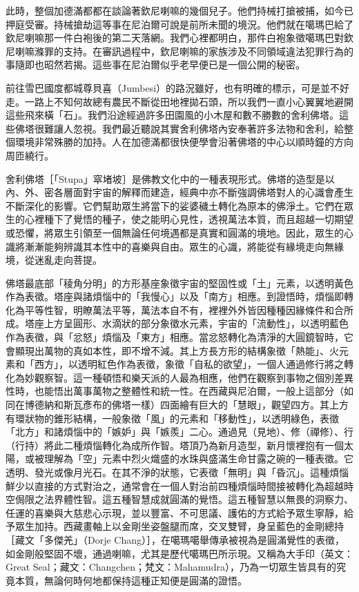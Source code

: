 此時，整個加德滿都都在談論著欽尼喇嘛的幾個兒子。他們持械打搶被捕，如今已押庭受審。持械搶劫這等事在尼泊爾可說是前所未聞的境況。他們就在噶瑪巴給了欽尼喇嘛那一件白袍後的第二天落網。我們心裡都明白，那件白袍象徵噶瑪巴對欽尼喇嘛滌罪的支持。在審訊過程中，欽尼喇嘛的家族涉及不同領域違法犯罪行為的事隨即也昭然若揭。這些事在尼泊爾似乎老早便已是一個公開的秘密。

前往雪巴國度都城尊貝喜（Jumbesi）的路況雖好，也有明確的標示，可是並不好走。一路上不知何故總有農民不斷從田地裡拋石頭，所以我們一直小心翼翼地避開這些飛來橫「石」。我們沿途經過許多田園風的小木屋和數不勝數的舍利佛塔。這些佛塔很難讓人忽視。我們最近聽說其實舍利佛塔內安奉著許多法物和舍利，給整個環境非常殊勝的加持。人在加德滿都很快便學會沿著佛塔的中心以順時鐘的方向周匝繞行。

舍利佛塔［「Stupa」窣堵坡］是佛教文化中的一種表現形式。佛塔的造型是以內、外、密各層面對宇宙的解釋而建造，經典中亦不斷強調佛塔對人的心識會產生不斷深化的影響。它們幫助眾生將當下的娑婆穢土轉化為原本的佛淨土。它們在眾生的心裡種下了覺悟的種子，使之能明心見性，透視萬法本質，而且超越一切期望或恐懼，將眾生引領至一個無論任何境遇都是真實和圓滿的境地。因此，眾生的心識將漸漸能夠辨識其本性中的喜樂與自由。眾生的心識，將能從有緣境走向無緣境，從迷亂走向菩提。

佛塔最底部「稜角分明」的方形基座象徵宇宙的堅固性或「土」元素，以透明黃色作為表徵。塔座與諸煩惱中的「我慢心」以及「南方」相應。到證悟時，煩惱即轉化為平等性智，明瞭萬法平等，萬法本自不有，裡裡外外皆因種種因緣條件和合所成。塔座上方呈圓形、水滴狀的部分象徵水元素，宇宙的「流動性」，以透明藍色作為表徵，與「忿怒」煩惱及「東方」相應。當忿怒轉化為清淨的大圓鏡智時，它會顯現出萬物的真如本性，即不增不減。其上方長方形的結構象徵「熱能」、火元素和「西方」，以透明紅色作為表徵，象徵「自私的欲望」，一個人通過修行將之轉化為妙觀察智。這一種頓悟和樂天派的人最為相應，他們在觀察到事物之個別差異性時，也能悟出萬事萬物之整體性和統一性。在西藏與尼泊爾，一般上這部分（如同在博德納和斯瓦彥布的佛塔一樣）四面繪有巨大的「慧眼」，觀望四方。其上方有環狀物的錐形結構，一般象徵「風」的元素和「移動性」，以透明綠色，表徵「北方」和諸煩惱中的「嫉妒」與「嫉羨」二心。通過見（見地）、修（禪修）、行（行持）將此二種煩惱轉化為成所作智。塔頂乃為新月造型，新月懷裡抱有一個太陽，或被理解為「空」元素中烈火熾盛的水珠與盛滿生命甘露之碗的一種表徵。它透明、發光或像月光石。在其不淨的狀態，它表徵「無明」與「昏沉」。這種煩惱鮮少以直接的方式對治之，通常會在一個人對治前四種煩惱時間接被轉化為超越時空侷限之法界體性智。這五種智慧成就圓滿的覺悟。這五種智慧以無畏的洞察力、任運的喜樂與大慈悲心示現，並以豐富、不可思議、護佑的方式給予眾生寧靜，給予眾生加持。西藏畫軸上以金剛坐姿盤腿而席，交叉雙臂，身呈藍色的金剛總持［藏文「多傑羌」（Dorje
Chang）］，在噶瑪噶舉傳承被視為是圓滿覺性的表徵，如金剛般堅固不壞，通過喇嘛，尤其是歷代噶瑪巴所示現。又稱為大手印（英文：Great
Seal；藏文：Changchen；梵文：Mahamudra），乃為一切眾生皆具有的究竟本質，無論何時何地都保持這種正知便是圓滿的證悟。

